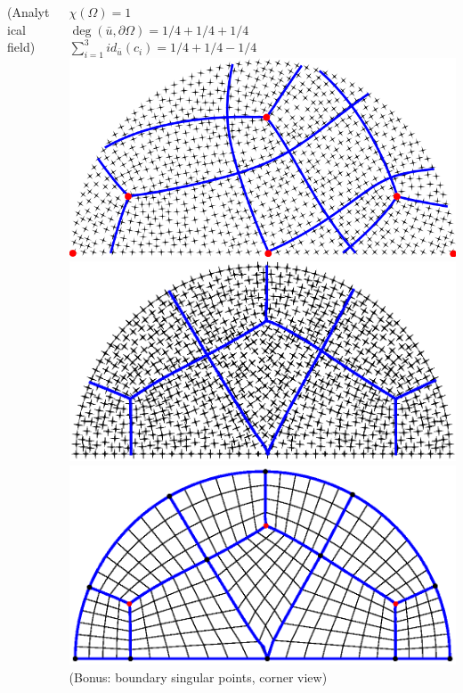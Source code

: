 \documentclass[compress,10pt,aspectratio=169]{beamer}
\begin{document}
\begin{frame}
\begin{columns}
\begin{column}{0.4\textwidth}
    \scriptsize {\color{onera_gray}(Analytical field)}
\end{column}
\pause
\begin{column}{0.4\textwidth}
    \centering
    \scriptsize
    $\chi(\Omega)=1$\\\vspace{0.1cm}
    $\deg(\bar{u}, \partial\Omega) = 1/4+1/4+1/4$\\\vspace{0.1cm}
    $\sum_{i=1}^{3} id_{\bar{u}}(c_i)=1/4+1/4-1/4$\\\vspace{0.1cm}
    \includegraphics[scale=0.32]{images/demiDiscTroisPointNonAligne.pdf}\\\vspace{0.1cm}
    \includegraphics[scale=0.32]{images/demiDIscTroisPointAligne.eps}\\\vspace{0.1cm}
    \includegraphics[scale=0.32]{images/mesh_quad_3.eps}\\
    \scriptsize {\color{onera_gray}(Bonus: boundary singular points, corner view)}
\end{column}
\end{columns}
\end{frame}
\end{document}
